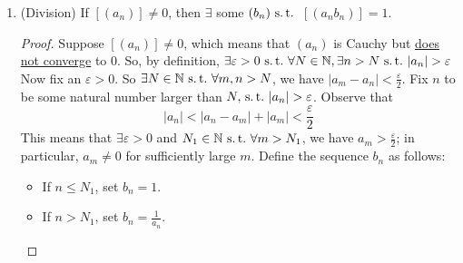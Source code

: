\documentclass[12pt]{amsart}
\newcommand{\bbN}{\mathbb{N}}
\newcommand{\suchthat}{\operatorname{\thinspace s.t. \thinspace}}
\theoremstyle{plain}
\theoremstyle{remark}
\theoremstyle{definition}
\begin{document}
\begin{enumerate}[(1)]
\begin{proof}
			Let $M$ be a positive upper bound for both $b_n$ and $c_n$. Then $\forall \varepsilon > 0$, 
			\begin{itemize}[-]
				\item $\exists N_1 \suchthat$ if $n > N_1$, then
					\begin{equation*}
						|a_n - c_n| < \frac{\varepsilon}{2M}
					\end{equation*}
				\item $\exists N_2 \suchthat$ if $n > N_2$, then 
					\begin{equation*}
						|b_n - d_n| < \frac{\varepsilon}{2M}
					\end{equation*}
			\end{itemize}
			So if $N = \max\Set{N_1, N_2}$ and $n > N$, then 
			\begin{equation*}
				|a_n b_n - c_n d_n| < M\cdot \frac{\varepsilon}{2M} + M \cdot \frac{\varepsilon}{2M} = \varepsilon
			\end{equation*}
			So $|a_n - b_n| \rightarrow 0$, indicating $(a_n b_n) \sim (c_n d_n)$.
			\newline
			So multiplication is well-defined.
		\end{proof}
			Further, multiplication distributes  over addition; and $[(a_n)] \cdot 1 = [(a_n)]$.
		\item (Division)
			If $[(a_n)] \neq 0$, then $\exists$ some $(b_n) \suchthat$ $[(a_n b_n)] = 1$.
			\begin{proof}
				Suppose $[(a_n)] \neq 0$, which means that $(a_n)$ is Cauchy but \ul{does not converge} to $0$. So, by definition, $\exists \varepsilon > 0 \suchthat \forall N \in \bbN, \exists n > N \suchthat |a_n| > \varepsilon$
				Now fix an $\varepsilon > 0$. So $\exists N \in \bbN \suchthat \forall m,n > N$, we have $|a_m - a_n| < \displaystyle \frac{\varepsilon}{2}$.
				\newline
				Fix $n$ to be some natural number larger than $N, \suchthat |a_n| > \varepsilon$. Observe that 
				\begin{equation*}
					|a_n| < |a_n - a_m| + |a_m| < \frac{\varepsilon}{2}
				\end{equation*}
				This means that $\exists \varepsilon > 0$ and $N_1 \in \bbN \suchthat \forall m > N_1$, we have $a_m > \displaystyle \frac{\varepsilon}{2}$; in particular, $a_m \neq 0$ for sufficiently large $m$.
				\newline
				Define the sequence $b_n$ as follows:
				\begin{itemize}[-]
					\item 
						If $n \leqslant N_1$, set $b_n = 1$.
					\item
						If $n > N_1$, set $b_n = \displaystyle \frac{1}{a_n}$.
				\end{itemize}


\end{proof}
\end{enumerate}
\end{document}
